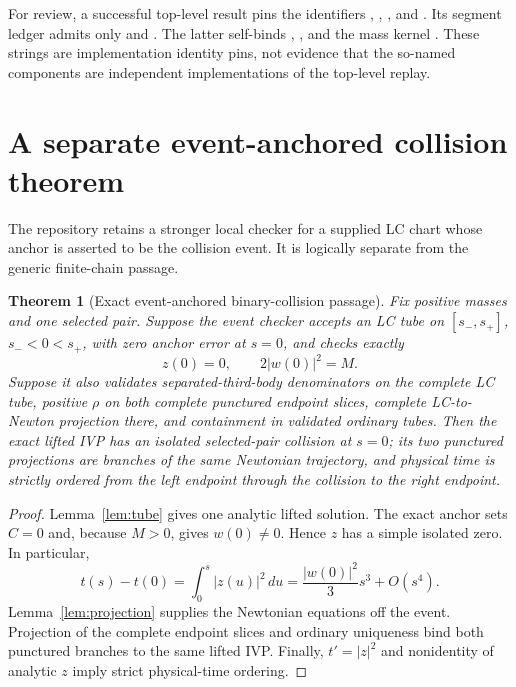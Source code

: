 \documentclass[11pt]{article}
\newtheorem{theorem}{Theorem}[section]
\begin{document}
For review, a successful top-level result pins the identifiers
,
,
, and
.  Its segment ledger admits
only  and
.  The latter self-binds
,
, and the mass kernel
.
These strings are implementation identity pins, not evidence that the
so-named components are independent implementations of the top-level replay.

\section{A separate event-anchored collision theorem}
\label{sec:collision}

The repository retains a stronger local checker for a supplied LC chart whose
anchor is asserted to be the collision event.  It is logically separate from
the generic finite-chain passage.

\begin{theorem}[Exact event-anchored binary-collision passage]
\label{thm:collision}
Fix positive masses and one selected pair.  Suppose the event checker accepts
an LC tube on $[s_-,s_+]$, $s_-<0<s_+$, with zero anchor error at $s=0$, and
checks exactly
\begin{equation}
 z(0)=0,\qquad 2|w(0)|^2=M.
 \label{eq:collision-anchor}
\end{equation}
Suppose it also validates separated-third-body denominators on the complete
LC tube, positive $\rho$ on both complete punctured endpoint slices, complete
LC-to-Newton projection there, and containment in validated ordinary tubes.
Then the exact lifted IVP has an isolated selected-pair collision at $s=0$;
its two punctured projections are branches of the same Newtonian trajectory,
and physical time is strictly ordered from the left endpoint through the
collision to the right endpoint.
\end{theorem}

\begin{proof}
Lemma~\ref{lem:tube} gives one analytic lifted solution.  The exact anchor
sets $C=0$ and, because $M>0$, gives $w(0)\ne0$.  Hence $z$ has a simple
isolated zero.  In particular,
\[
 t(s)-t(0)=\int_0^s|z(u)|^2\,du
 =\frac{|w(0)|^2}{3}s^3+O(s^4).
\]
Lemma~\ref{lem:projection} supplies the Newtonian equations off the event.
Projection of the complete endpoint slices and ordinary uniqueness bind both
punctured branches to the same lifted IVP.  Finally, $t'=|z|^2$ and
nonidentity of analytic $z$ imply strict physical-time ordering.
\end{proof}
\end{document}
